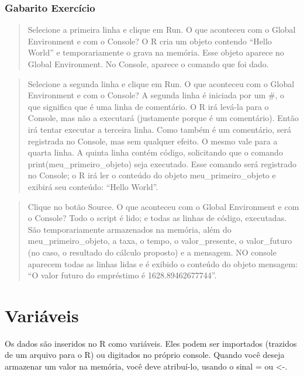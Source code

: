 \documentclass[
]{book}
\begin{document}
\hypertarget{gabarito-exercuxedcio}{%
\subsection{Gabarito Exercício}\label{gabarito-exercuxedcio}}

\begin{quote}
Selecione a primeira linha e clique em Run. O que aconteceu com o Global Environment e com o Console? O R cria um objeto contendo ``Hello World'' e temporariamente o grava na memória. Esse objeto aparece no Global Environment. No Console, aparece o comando que foi dado.
\end{quote}

\begin{quote}
Selecione a segunda linha e clique em Run. O que aconteceu com o Global Environment e com o Console? A segunda linha é iniciada por um \#, o que significa que é uma linha de comentário. O R irá levá-la para o Console, mas não a executará (justamente porque é um comentário). Então irá tentar executar a terceira linha. Como também é um comentário, será registrada no Console, mas sem qualquer efeito. O mesmo vale para a quarta linha. A quinta linha contém código, solicitando que o comando print(meu\_primeiro\_objeto) seja executado. Esse comando será registrado no Console; o R irá ler o conteúdo do objeto meu\_primeiro\_objeto e exibirá seu conteúdo: ``Hello World''.
\end{quote}

\begin{quote}
Clique no botão Source. O que aconteceu com o Global Environment e com o Console? Todo o script é lido; e todas as linhas de código, executadas. São temporariamente armazenados na memória, além do meu\_primeiro\_objeto, a taxa, o tempo, o valor\_presente, o valor\_futuro (no caso, o resultado do cálculo proposto) e a mensagem. NO console aparecem todas as linhas lidas e é exibido o conteúdo do objeto mensagem: ``O valor futuro do empréstimo é 1628.89462677744''.
\end{quote}

\hypertarget{variuxe1veis}{%
\chapter{Variáveis}\label{variuxe1veis}}

Os dados são inseridos no R como variáveis. Eles podem ser importados (trazidos de um arquivo para o R) ou digitados no próprio console. Quando você deseja armazenar um valor na memória, você deve atribuí-lo, usando o sinal = ou \textless-.
\end{document}
